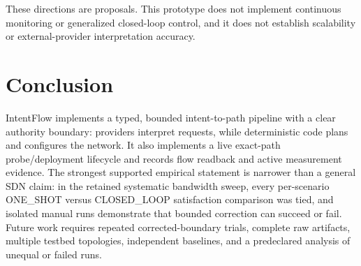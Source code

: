 \documentclass[conference]{IEEEtran}
\begin{document}
These directions are proposals. This prototype does not implement continuous
monitoring or generalized closed-loop control, and it does not establish
scalability or external-provider interpretation accuracy.

\section{Conclusion}
IntentFlow implements a typed, bounded intent-to-path pipeline with a clear
authority boundary: providers interpret requests, while deterministic code
plans and configures the network. It also implements a live exact-path
probe/deployment lifecycle and records flow readback and active measurement
evidence. The strongest supported empirical statement is narrower than a
general SDN claim: in the retained systematic bandwidth sweep, every
per-scenario ONE\_SHOT versus CLOSED\_LOOP satisfaction comparison was tied,
and isolated manual runs demonstrate that bounded correction can succeed or
fail. Future work requires repeated corrected-boundary trials, complete raw
artifacts, multiple testbed topologies, independent baselines, and a
predeclared analysis of unequal or failed runs.
\end{document}
